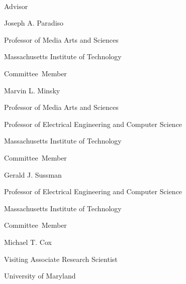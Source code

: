 \thispagestyle{empty}
\begin{center}
    \spacedlowsmallcaps{\myName} \\ \medskip                        

    \begingroup
        \color{Maroon}\spacedallcaps{\myTitle}
    \endgroup
\end{center}        

\begin{flushright}
  \vspace{5mm}

           Advisor\hspace{0.5cm}~\makebox[2.75in]{\hrulefill}

                                 Joseph A. Paradiso

                                 Professor of Media Arts and Sciences
                                 
                                 Massachusetts Institute of Technology
                                 
  \vspace{5mm}
  
  Committee~Member\hspace{0.5cm}~\makebox[2.75in]{\hrulefill}
  
                                 Marvin L. Minsky

                                 Professor of Media Arts and Sciences

                                 Professor of Electrical Engineering and Computer Science
                                 
                                 Massachusetts Institute of Technology
                                 
  \vspace{5mm}

  Committee~Member\hspace{0.5cm}~\makebox[2.75in]{\hrulefill}
  
                                 Gerald J. Sussman

                                 Professor of Electrical Engineering and Computer Science
                                 
                                 Massachusetts Institute of Technology

  \vspace{5mm}

  Committee~Member\hspace{0.5cm}~\makebox[2.75in]{\hrulefill}

                                 Michael T. Cox

                                 Visiting Associate Research Scientist
                                 
                                 University of Maryland

\end{flushright}


